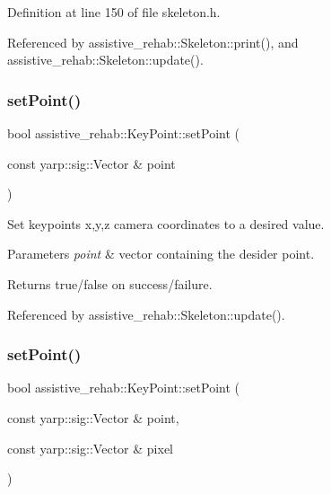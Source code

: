 Definition at line 150 of file skeleton.\+h.


\begin{DoxyCode}{0}

\end{DoxyCode}


Referenced by assistive\+\_\+rehab\+::\+Skeleton\+::print(), and assistive\+\_\+rehab\+::\+Skeleton\+::update().

\mbox{\label{classassistive__rehab_1_1KeyPoint_a6430d1d6b7704a85462de39b6962e48b}} 
\subsubsection{\texorpdfstring{setPoint()}{setPoint()}\hspace{0.1cm}{\footnotesize\ttfamily [1/2]}}
{\footnotesize\ttfamily bool assistive\+\_\+rehab\+::\+Key\+Point\+::set\+Point (\begin{DoxyParamCaption}\item[{const yarp\+::sig\+::\+Vector \&}]{point }\end{DoxyParamCaption})}



Set keypoint\textquotesingle{}s x,y,z camera coordinates to a desired value. 


\begin{DoxyParams}{Parameters}
{\em point} & vector containing the desider point. \\
\hline
\end{DoxyParams}
\begin{DoxyReturn}{Returns}
true/false on success/failure. 
\end{DoxyReturn}


Referenced by assistive\+\_\+rehab\+::\+Skeleton\+::update().

\mbox{\label{classassistive__rehab_1_1KeyPoint_adcb8950f2c32cdf93c3d4b2f6a9f1a70}} 
\subsubsection{\texorpdfstring{setPoint()}{setPoint()}\hspace{0.1cm}{\footnotesize\ttfamily [2/2]}}
{\footnotesize\ttfamily bool assistive\+\_\+rehab\+::\+Key\+Point\+::set\+Point (\begin{DoxyParamCaption}\item[{const yarp\+::sig\+::\+Vector \&}]{point,  }\item[{const yarp\+::sig\+::\+Vector \&}]{pixel }\end{DoxyParamCaption})}



